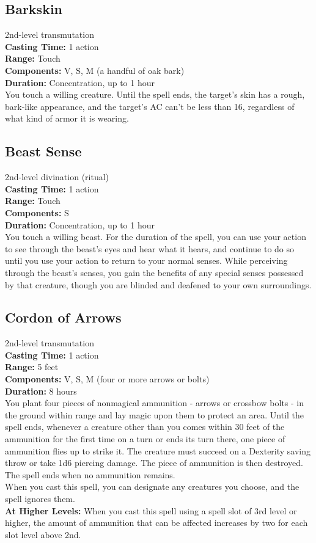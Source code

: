\documentclass[11pt, A4paper, english]{article}
\begin{document}
		\subsection{Barkskin}
2nd-level transmutation \\
\textbf{Casting Time:} 1 action \\
\textbf{Range:} Touch \\
\textbf{Components:} V, S, M (a handful of oak bark) \\
\textbf{Duration:} Concentration, up to 1 hour \\
You touch a willing creature. Until the spell ends, the target’s skin has a rough, bark-like appearance, and the target’s AC can't be less than 16, regardless of what kind of armor it is wearing.

		\subsection{Beast Sense}
2nd-level divination (ritual) \\
\textbf{Casting Time:} 1 action \\
\textbf{Range:} Touch \\
\textbf{Components:} S \\
\textbf{Duration:} Concentration, up to 1 hour \\
You touch a willing beast. For the duration of the spell, you can use your action to see through the beast’s eyes and hear what it hears, and continue to do so until you use your action to return to your normal senses. While perceiving through the beast’s senses, you gain the benefits of any special senses possessed by that creature, though you are blinded and deafened to your own surroundings.

		\subsection{Cordon of Arrows}
2nd-level transmutation \\
\textbf{Casting Time:} 1 action \\
\textbf{Range:} 5 feet \\
\textbf{Components:} V, S, M (four or more arrows or bolts) \\
\textbf{Duration:} 8 hours \\
You plant four pieces of nonmagical ammunition - arrows or crossbow bolts - in the ground within range and lay magic upon them to protect an area. Until the spell ends, whenever a creature other than you comes within 30 feet of the ammunition for the first time on a turn or ends its turn there, one piece of ammunition flies up to strike it. The creature must succeed on a Dexterity saving throw or take 1d6 piercing damage. The piece of ammunition is then destroyed. The spell ends when no ammunition remains. \\
When you cast this spell, you can designate any creatures you choose, and the spell ignores them. \\
\textbf{At Higher Levels:} When you cast this spell using a spell slot of 3rd level or higher, the amount of ammunition that can be affected increases by two for each slot level above 2nd.
\end{document}
